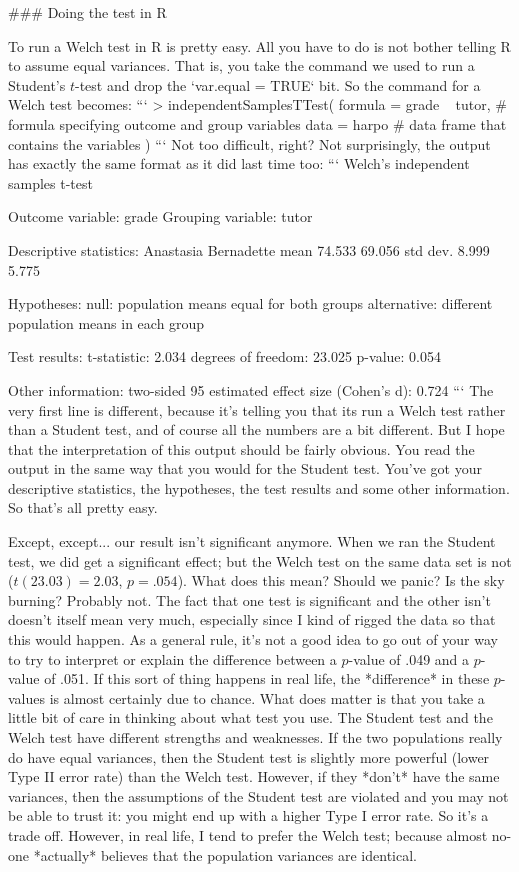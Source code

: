 ### Doing the test in R

To run a Welch test in R is pretty easy. All you have to do is not bother telling R to assume equal variances. That is, you take the command we used to run a Student's $t$-test and drop the `var.equal = TRUE` bit. So the command for a Welch test becomes:
```
> independentSamplesTTest( 
      formula = grade ~ tutor,  # formula specifying outcome and group variables
      data = harpo              # data frame that contains the variables
  )
```
Not too difficult, right? Not surprisingly, the output has exactly the same format as it did last time too:
```
   Welch's independent samples t-test 

Outcome variable:   grade 
Grouping variable:  tutor 

Descriptive statistics: 
            Anastasia Bernadette
   mean        74.533     69.056
   std dev.     8.999      5.775

Hypotheses: 
   null:        population means equal for both groups
   alternative: different population means in each group

Test results: 
   t-statistic:  2.034 
   degrees of freedom:  23.025 
   p-value:  0.054 

Other information: 
   two-sided 95%
   estimated effect size (Cohen's d):  0.724 
```
The very first line is different, because it's telling you that its run a Welch test rather than a Student test, and of course all the numbers are a bit different. But I hope that the interpretation of this output should be fairly obvious. You read the output in the same way that you would for the Student test. You've got your descriptive statistics, the hypotheses, the test results and some other information. So that's all pretty easy. 

Except, except... our result isn't significant anymore. When we ran the Student test, we did get a significant effect; but the Welch test on the same data set is not ($t(23.03) = 2.03$, $p = .054$). What does this mean? Should we panic? Is the sky burning? Probably not. The fact that one test is significant and the other isn't doesn't itself mean very much, especially since I kind of rigged the data so that this would happen. As a general rule, it's not a good idea to go out of your way to try to interpret or explain the difference between a $p$-value of .049 and a $p$-value of .051. If this sort of thing happens in real life, the *difference* in these $p$-values is almost certainly due to chance. What does matter is that you take a little bit of care in thinking about what test you use. The Student test and the Welch test have different strengths and weaknesses. If the two populations really do have equal variances, then the Student test is slightly more powerful (lower Type II error rate) than the Welch test. However, if they *don't* have the same variances, then the assumptions of the Student test are violated and you may not be able to trust it: you might end up with a higher Type I error rate. So it's a trade off. However, in real life, I tend to prefer the Welch test; because almost no-one *actually* believes that the population variances are identical.


